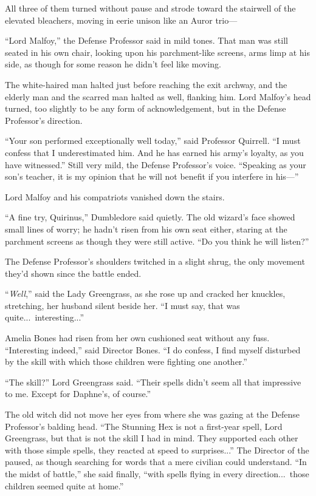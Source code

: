 All three of them turned without pause and strode toward the
stairwell of the elevated bleachers, moving in eerie unison like an
Auror trio—

“Lord Malfoy,” the Defense Professor said in mild tones. That
man was still seated in his own chair, looking upon his
parchment-like screens, arms limp at his side, as though for some
reason he didn’t feel like moving.

The white-haired man halted just before reaching the exit
archway, and the elderly man and the scarred man halted as well,
flanking him. Lord Malfoy’s head turned, too slightly to be any
form of acknowledgement, but in the Defense Professor’s
direction.

“Your son performed exceptionally well today,” said Professor
Quirrell. “I must confess that I underestimated him. And he has
earned his army’s loyalty, as you have witnessed.” Still very mild,
the Defense Professor’s voice. “Speaking as your son’s teacher, it
is my opinion that he will not benefit if you interfere in his—”

Lord Malfoy and his compatriots vanished down the stairs.

“A fine try, Quirinus,” Dumbledore said quietly. The old
wizard’s face showed small lines of worry; he hadn’t risen from his
own seat either, staring at the parchment screens as though they
were still active. “Do you think he will listen?”

The Defense Professor’s shoulders twitched in a slight shrug,
the only movement they’d shown since the battle ended.

“\emph{Well},” said the Lady Greengrass, as she rose up and
cracked her knuckles, stretching, her husband silent beside her. “I
must say, that was quite...\ interesting...”

Amelia Bones had risen from her own cushioned seat without any
fuss. “Interesting indeed,” said Director Bones. “I do confess, I
find myself disturbed by the skill with which those children were
fighting one another.”

“The skill?” Lord Greengrass said. “Their spells didn’t seem all
that impressive to me. Except for Daphne’s, of course.”

The old witch did not move her eyes from where she was gazing at
the Defense Professor’s balding head. “The Stunning Hex is not a
first-year spell, Lord Greengrass, but that is not the skill I had
in mind. They supported each other with those simple spells, they
reacted at speed to surprises...” The Director of the  paused,
as though searching for words that a mere civilian could
understand. “In the midst of battle,” she said finally, “with
spells flying in every direction...\ those children seemed quite at
home.”

